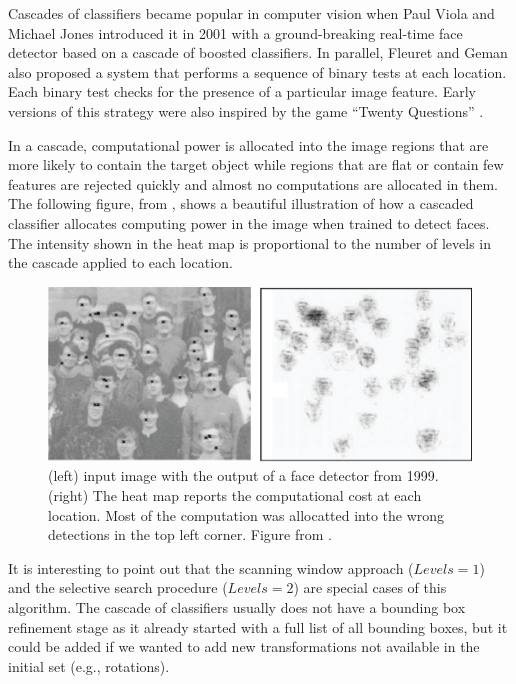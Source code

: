 Cascades of classifiers became popular in computer vision when Paul Viola and Michael Jones \cite{Viola01} introduced it in 2001 with a ground-breaking real-time face detector based on a cascade of boosted classifiers. In parallel, Fleuret and Geman \cite{Fleuret2001} also proposed a system that performs a sequence of binary tests at each location. Each binary test checks for the presence of a particular image feature. Early versions of this strategy were also inspired by the game ``Twenty Questions''  \cite{Geman1994}. 

In a cascade, computational power is allocated into the image regions that are more likely to contain the target object while regions that are flat or contain few features are rejected quickly and almost no computations are allocated in them. The following figure, from \cite{Fleuret2001}, shows a beautiful illustration of how a cascaded classifier allocates computing power in the image when trained to detect faces. The intensity shown in the heat map is proportional to the number of levels in the cascade applied to each location.

\begin{figure}
\centerline{
\includegraphics[width=.8\linewidth]{figures/object_recognition/cascade.eps}
}
\caption{(left) input image with the output of a face detector from 1999. (right) The heat map reports the computational cost at each location. Most of the computation was allocatted into the wrong detections in the top left corner. Figure from \cite{Fleuret2001}.}
\end{figure}

It is interesting to point out that the scanning window approach ($Levels = 1$) and the selective search procedure ($Levels = 2$) are special cases of this algorithm. The cascade of classifiers usually does not have a bounding box refinement stage as it already started with a full list of all bounding boxes, but it could be added if we wanted to add new transformations not available in the initial set (e.g., rotations). 

